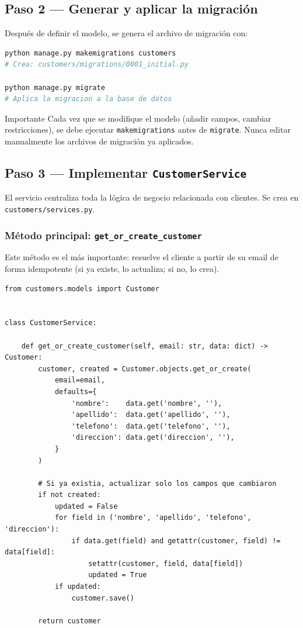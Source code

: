 \documentclass[12pt, a4paper]{article}
\begin{document}
\subsection{Paso 2 — Generar y aplicar la migración}

Después de definir el modelo, se genera el archivo de migración con:

\begin{lstlisting}[language=bash, style=python, caption={Comandos de consola}]
python manage.py makemigrations customers
# Crea: customers/migrations/0001_initial.py

python manage.py migrate
# Aplica la migracion a la base de datos
\end{lstlisting}

\begin{warningbox}{Importante}
Cada vez que se modifique el modelo (añadir campos, cambiar restricciones), se debe ejecutar \texttt{makemigrations} antes de \texttt{migrate}. Nunca editar manualmente los archivos de migración ya aplicados.
\end{warningbox}

\subsection{Paso 3 — Implementar \texttt{CustomerService}}

El servicio centraliza toda la lógica de negocio relacionada con clientes. Se crea en \texttt{customers/services.py}.

\subsubsection{Método principal: \texttt{get\_or\_create\_customer}}

Este método es el más importante: resuelve el cliente a partir de su email de forma idempotente (si ya existe, lo actualiza; si no, lo crea).

\begin{lstlisting}[caption={customers/services.py — get\_or\_create\_customer}]
from customers.models import Customer


class CustomerService:

    def get_or_create_customer(self, email: str, data: dict) -> Customer:
        customer, created = Customer.objects.get_or_create(
            email=email,
            defaults={
                'nombre':    data.get('nombre', ''),
                'apellido':  data.get('apellido', ''),
                'telefono':  data.get('telefono', ''),
                'direccion': data.get('direccion', ''),
            }
        )

        # Si ya existia, actualizar solo los campos que cambiaron
        if not created:
            updated = False
            for field in ('nombre', 'apellido', 'telefono', 'direccion'):
                if data.get(field) and getattr(customer, field) != data[field]:
                    setattr(customer, field, data[field])
                    updated = True
            if updated:
                customer.save()

        return customer
\end{lstlisting}
\end{document}
